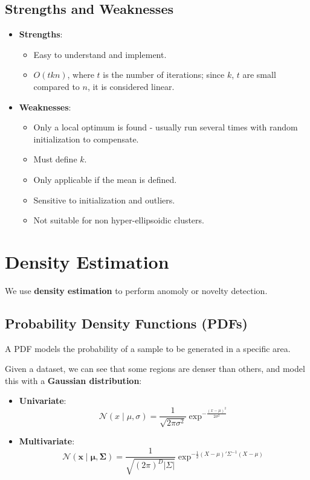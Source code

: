 \documentclass[11pt]{article}
\begin{document}
\subsection{Strengths and Weaknesses}
\begin{itemize}
  \item \textbf{Strengths}:
    \begin{itemize}
      \item Easy to understand and implement.
      \item $O(tkn)$, where $t$ is the number of iterations; since $k$, $t$ are small compared to $n$, it is considered linear.
    \end{itemize}
  \item \textbf{Weaknesses}:
    \begin{itemize}
      \item Only a local optimum is found - usually run several times with random initialization to compensate.
      \item Must define $k$.
      \item Only applicable if the mean is defined.
      \item Sensitive to initialization and outliers.
      \item Not suitable for non hyper-ellipsoidic clusters.
    \end{itemize}
\end{itemize}

\section{Density Estimation}
We use \textbf{density estimation} to perform anomoly or novelty detection.

\subsection{Probability Density Functions (PDFs)}
A PDF models the probability of a sample to be generated in a specific area.

Given a dataset, we can see that some regions are denser than others, and model this with a \textbf{Gaussian distribution}:
\begin{itemize}
  \item \textbf{Univariate}:
    \[
      \mathcal{N}(x \mid \mu, \sigma) = \frac{1}{\sqrt{2 \pi \sigma^2}}\exp^{-\frac{(x - \mu)^2}{2 \sigma^2}} 
    \]
  \item \textbf{Multivariate}:
    \[
      \mathcal{N}(\bm{x} \mid \bm{\mu}, \bm{\Sigma}) = \frac{1}{\sqrt{(2\pi)^D \lvert \Sigma \rvert}}\exp^{-\frac{1}{2} (X - \mu)' \Sigma^{-1}(X - \mu)}
    \]
\end{itemize}
\end{document}
